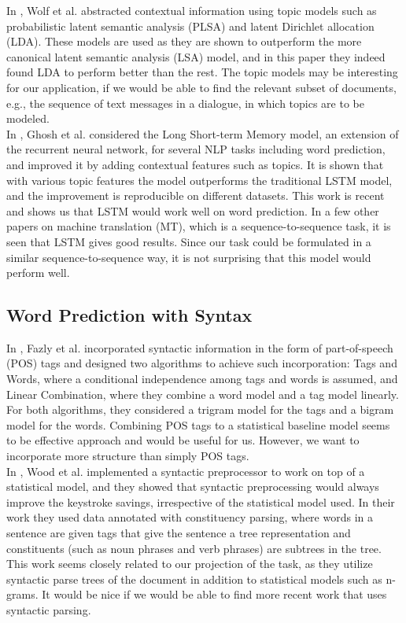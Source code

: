 \documentclass[14pt, oneside]{article}   	%
\begin{document}
In \cite{wolf2006use},
Wolf et al. abstracted contextual information using topic models
such as probabilistic latent semantic analysis (PLSA) and latent Dirichlet allocation (LDA).
These models are used as they are shown to outperform the more canonical latent semantic analysis (LSA) model,
and in this paper they indeed found LDA to perform better than the rest.
The topic models may be interesting for our application,
if we would be able to find the relevant subset of documents,
e.g., the sequence of text messages in a dialogue, in which topics are to be modeled.\\

In \cite{ghosh2016contextual},
Ghosh et al. considered the Long Short-term Memory model,
an extension of the recurrent neural network, for several NLP tasks including word prediction,
and improved it by adding contextual features such as topics.
It is shown that with various topic features the model outperforms the traditional LSTM model,
and the improvement is reproducible on different datasets.
This work is recent and shows us that LSTM would work well on word prediction.
In a few other papers on machine translation (MT),
which is a sequence-to-sequence task, it is seen that LSTM gives good results.
Since our task could be formulated in a similar sequence-to-sequence way,
it is not surprising that this model would perform well.

\subsection{Word Prediction with Syntax}
In \cite{fazly2003testing},
Fazly et al. incorporated syntactic information in the form of part-of-speech (POS) tags
and designed two algorithms to achieve such incorporation:
Tags and Words, where a conditional independence among tags and words is assumed,
and Linear Combination, where they combine a word model and a tag model linearly.
For both algorithms, they considered a trigram model for the tags
and a bigram model for the words.
Combining POS tags to a statistical baseline model seems to be effective approach
and would be useful for us.
However, we want to incorporate more structure than simply POS tags.\\

In \cite{wood1996windmill},
Wood et al. implemented a syntactic preprocessor to work on top of a statistical model,
and they showed that syntactic preprocessing would always improve the keystroke savings,
irrespective of the statistical model used.
In their work they used data annotated with constituency parsing,
where words in a sentence are given tags that give the sentence a tree representation
and constituents (such as noun phrases and verb phrases) are subtrees in the tree.
This work seems closely related to our projection of the task,
as they utilize syntactic parse trees of the document in addition to statistical models
such as n-grams.
It would be nice if we would be able to find more recent work that uses syntactic parsing.\\
\end{document}
